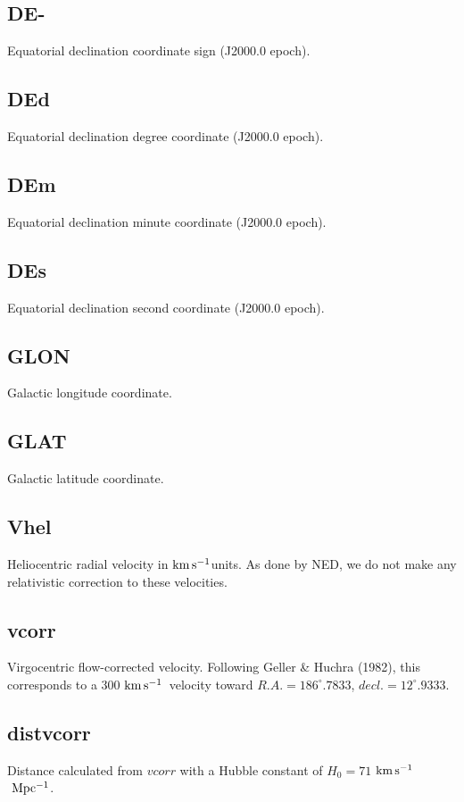 \documentclass[iop]{emulateapj-rtx4}
\newcommand{\kms}{$\rm km\, s^{-1}$}
\begin{document}
\subsection{DE-}
Equatorial declination coordinate sign (J2000.0 epoch).

\subsection{DEd}
Equatorial declination degree coordinate (J2000.0 epoch).

\subsection{DEm}
Equatorial declination minute coordinate (J2000.0 epoch).

\subsection{DEs}
Equatorial declination second coordinate (J2000.0 epoch).

\subsection{GLON}
Galactic longitude coordinate.

\subsection{GLAT}
Galactic latitude coordinate.

\subsection{Vhel}
Heliocentric radial velocity in \kms units. As done by NED, we do not make any relativistic correction to these velocities.

\subsection{vcorr}
Virgocentric flow-corrected velocity. Following Geller \& Huchra (1982), this corresponds to a 300 \kms~velocity toward $R.A. = 186^{\circ}.7833$, $decl. = 12^{\circ}.9333$.

\subsection{distvcorr}
Distance calculated from $vcorr$ with a Hubble constant of $H_0 = 71$ \kms $~\rm Mpc^{-1}$.
\end{document}
